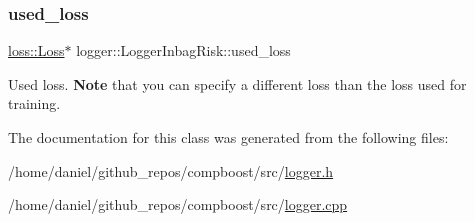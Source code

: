\subsubsection{\texorpdfstring{used\+\_\+loss}{used\_loss}}
{\footnotesize\ttfamily \hyperlink{classloss_1_1_loss}{loss\+::\+Loss}$\ast$ logger\+::\+Logger\+Inbag\+Risk\+::used\+\_\+loss\hspace{0.3cm}{\ttfamily [private]}}



Used loss. {\bfseries Note} that you can specify a different loss than the loss used for training. 



The documentation for this class was generated from the following files\+:\begin{DoxyCompactItemize}
\item 
/home/daniel/github\+\_\+repos/compboost/src/\hyperlink{logger_8h}{logger.\+h}\item 
/home/daniel/github\+\_\+repos/compboost/src/\hyperlink{logger_8cpp}{logger.\+cpp}\end{DoxyCompactItemize}

